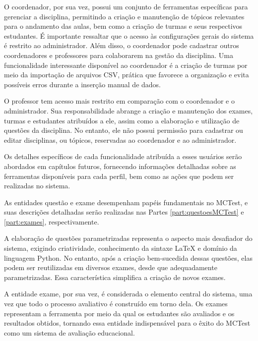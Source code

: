 O coordenador, por sua vez, possui um conjunto de ferramentas específicas para gerenciar a disciplina, permitindo a criação e manutenção de tópicos relevantes para o andamento das aulas, bem como a criação de turmas e seus respectivos estudantes. É importante ressaltar que o acesso às configurações gerais do sistema é restrito ao administrador. Além disso, o coordenador pode cadastrar outros coordenadores e professores para colaborarem na gestão da disciplina. Uma funcionalidade interessante disponível ao coordenador é a criação de turmas por meio da importação de arquivos CSV, prática que favorece a organização e evita possíveis erros durante a inserção manual de dados.

O professor tem acesso mais restrito em comparação com o coordenador e o administrador. Sua responsabilidade abrange a criação e manutenção dos exames, turmas e estudantes atribuídos a ele, assim como a elaboração e utilização de questões da disciplina. No entanto, ele não possui permissão para cadastrar ou editar disciplinas, ou tópicos, reservadas ao coordenador e ao administrador. 

Os detalhes específicos de cada funcionalidade atribuída a esses usuários serão abordados em capítulos futuros, fornecendo informações detalhadas sobre as ferramentas disponíveis para cada perfil, bem como as ações que podem ser realizadas no sistema.

As entidades questão e exame desempenham papéis fundamentais no MCTest, e suas descrições detalhadas serão realizadas nas Partes \ref{part:questoesMCTest} e \ref{part:exames}, respectivamente. %

A elaboração de questões parametrizadas representa o aspecto mais desafiador do sistema, exigindo criatividade, conhecimento da sintaxe \LaTeX{} e domínio da linguagem Python. No entanto, após a criação bem-sucedida dessas questões, elas podem ser reutilizadas em diversos exames, desde que adequadamente parametrizadas. Essa característica simplifica a criação de novos exames.

A entidade exame, por sua vez, é considerada o elemento central do sistema, uma vez que todo o processo avaliativo é construído em torno dela. Os exames representam a ferramenta por meio da qual os estudantes são avaliados e os resultados obtidos, tornando essa entidade indispensável para o êxito do MCTest como um sistema de avaliação educacional.